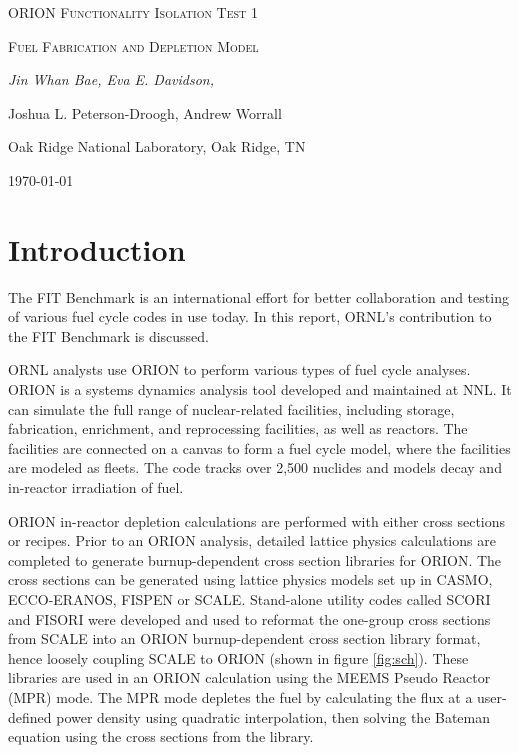 \documentclass{article}
\begin{document}
\begin{titlepage}
    \centering
    {\scshape\LARGE ORION Functionality Isolation Test 1  \par}
    \vspace{1cm}
    {\scshape\Large Fuel Fabrication and Depletion Model\par}
    \vspace{2cm}
    {\Large\itshape Jin Whan Bae, Eva E. Davidson, 
    
    Joshua L. Peterson-Droogh, Andrew Worrall \par}
    \vfill
    Oak Ridge National Laboratory, Oak Ridge, TN
    \vfill
    \vfill

    {\large \today\par}
\end{titlepage}




\section{Introduction}
The \gls{FIT} Benchmark is an international effort for better collaboration and testing of
various fuel cycle codes in use today. In this report, \gls{ORNL}'s contribution
to the \gls{FIT} Benchmark is discussed.

\gls{ORNL} analysts use ORION to perform various types of fuel cycle analyses.
ORION \cite{gregg_benefits_2013} is a systems dynamics analysis tool developed and maintained at \gls{NNL}.
It can simulate the full range of nuclear-related facilities, including storage, fabrication, enrichment,
and reprocessing facilities, as well as reactors. The facilities are connected on a canvas to form a
fuel cycle model, where the facilities are modeled as fleets. The code tracks over 2,500 nuclides
and models decay and in-reactor irradiation of fuel.

ORION in-reactor depletion calculations are performed with either cross sections or recipes.
Prior to an ORION analysis, detailed lattice physics calculations are completed to generate burnup-dependent
cross section libraries for ORION. The cross sections can be generated using lattice physics models set up in CASMO,
ECCO-ERANOS, FISPEN or SCALE. Stand-alone utility codes called SCORI and FISORI were developed and used to reformat
the one-group cross sections from SCALE into an ORION burnup-dependent cross section library format, hence loosely
coupling SCALE to ORION (shown in figure \ref{fig:sch}). These libraries are used in an ORION calculation using the MEEMS Pseudo Reactor (MPR) mode.
The MPR mode depletes the fuel by calculating the flux at a user-defined power density using quadratic interpolation,
 then solving the Bateman equation using the cross sections from the library. 
\end{document}
